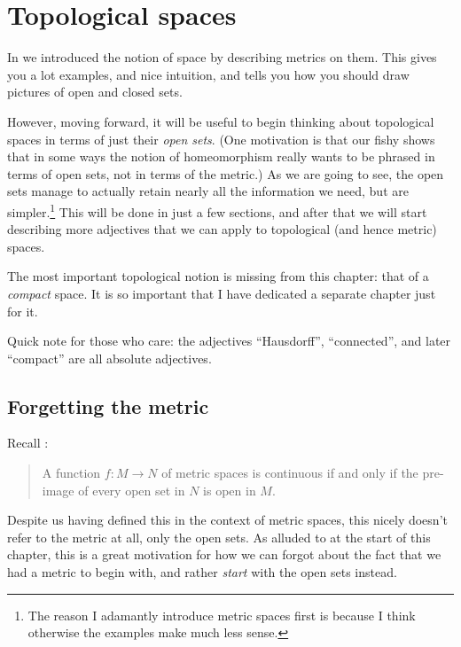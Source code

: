 \chapter{Topological spaces}
\label{ch:top_more}

In  we introduced the notion
of space by describing metrics on them.
This gives you a lot examples, and nice intuition,
and tells you how you should draw pictures of open and closed sets.

However, moving forward, it will be useful to begin
thinking about topological spaces in terms of just their \emph{open sets}.
(One motivation is that our fishy  shows that
in some ways the notion of homeomorphism really wants
to be phrased in terms of open sets, not in terms of the metric.)
As we are going to see, the open sets manage to actually retain
nearly all the information we need, but are simpler.\footnote{The
	reason I adamantly introduce metric spaces first
	is because I think otherwise the examples make much less sense.}
This will be done in just a few sections,
and after that we will start describing more adjectives
that we can apply to topological (and hence metric) spaces.

The most important topological notion is missing from this chapter:
that of a \emph{compact} space.
It is so important that I have dedicated a separate chapter just for it.

Quick note for those who care:
the adjectives ``Hausdorff'', ``connected'',
and later ``compact'' are all absolute adjectives.



\section{Forgetting the metric}
Recall :
\begin{quote}
	A function $f \colon M \to N$ of metric spaces is continuous
	if and only if the pre-image of every open set in $N$ is open in $M$.
\end{quote}
Despite us having defined this in the context of metric spaces,
this nicely doesn't refer to the metric at all,
only the open sets.
As alluded to at the start of this chapter,
this is a great motivation for how we can forgot
about the fact that we had a metric to begin with,
and rather \emph{start} with the open sets instead.

